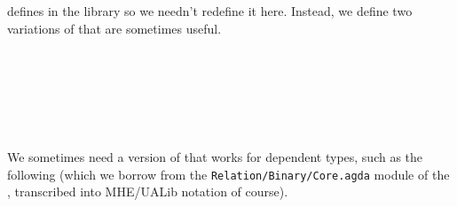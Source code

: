 \mhe defines  in the \TypeTopology library so we needn't redefine it here. Instead, we define two variations of  that are sometimes useful.
\ccpad
\begin{code}%
\>[0]\AgdaSpace{}%
\AgdaSymbol{:}%
\>[128I]\AgdaSymbol{\{}\AgdaSpace{}%
\AgdaSpace{}%
\AgdaSymbol{:}\AgdaSpace{}%
\AgdaSymbol{\}}\AgdaSpace{}%
\AgdaSymbol{\{}\AgdaSpace{}%
\AgdaSymbol{:}\AgdaSpace{}%
\AgdaSpace{}%
\AgdaSymbol{\}}\AgdaSpace{}%
\AgdaSymbol{\{}\AgdaSpace{}%
\AgdaSymbol{:}\AgdaSpace{}%
\AgdaSpace{}%
\AgdaSymbol{\}}\<%
\\
\>[.][@{}l@{}]\<[128I]%
\>[10]\AgdaSymbol{\{}\AgdaSpace{}%
\AgdaSpace{}%
\AgdaSymbol{:}\AgdaSpace{}%
\AgdaSpace{}%
\AgdaSpace{}%
\AgdaSymbol{\}}\AgdaSpace{}%
\AgdaSymbol{\{}\AgdaSpace{}%
\AgdaSpace{}%
\AgdaSymbol{:}\AgdaSpace{}%
\AgdaSymbol{\}}\<%
\\
\>[0][@{}l@{\AgdaIndent{0}}]%
\>[1]%
\>[10]\AgdaSpace{}%
\AgdaSpace{}%
%
\>[19]%
\>[24]\AgdaSpace{}%
\AgdaSpace{}%
\<%
\\
%
\>[10]\AgdaComment{-----------------------}\<%
\\
%
\>[1]%
\>[10]\AgdaSpace{}%
\AgdaSpace{}%
\AgdaSpace{}%
\AgdaSpace{}%
\<%
\\
%
\>[0]\AgdaSpace{}%
\AgdaSymbol{(}\AgdaSpace{}%
\AgdaSymbol{\AgdaUnderscore{})}\AgdaSpace{}%
\AgdaSymbol{(}\AgdaSpace{}%
\AgdaSymbol{\AgdaUnderscore{})}\AgdaSpace{}%
\AgdaSymbol{=}\AgdaSpace{}%
\AgdaSpace{}%
\AgdaSymbol{\AgdaUnderscore{}}\<%
\end{code}
\ccpad
We sometimes need a version of  that works for dependent types, such as the following (which we borrow from the \texttt{Relation/Binary/Core.agda} module of the \agdastdlib, transcribed into MHE/UALib notation of course).
\ccpad
